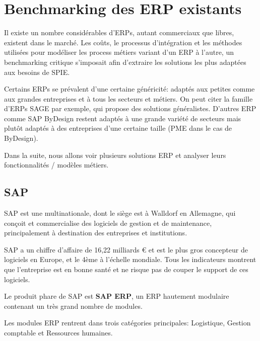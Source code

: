 \section{Benchmarking des ERP existants}
    Il existe un nombre considérables d'ERPs, autant commerciaux que libres, existent dans le marché. Les coûts, le processus d'intégration et les méthodes utilisées pour modéliser les process métiers variant d'un ERP à l'autre, un benchmarking critique s'imposait afin d'extraire les solutions les plus adaptées aux besoins de SPIE.

    Certains ERPs se prévalent d'une certaine généricité: adaptés aux petites comme aux grandes entreprises et à tous les secteurs et métiers. On peut citer la famille d'ERPs SAGE par exemple, qui propose des solutions généralistes. D'autres ERP comme SAP ByDesign restent adaptés à une grande variété de secteurs mais plutôt adaptés à des entreprises d'une certaine taille (PME dans le cas de ByDesign).

    Dans la suite, nous allons voir plusieurs solutions ERP et analyser leurs fonctionnalités / modèles métiers.

    \subsection{SAP}

    SAP est une multinationale, dont le siège est à Walldorf en Allemagne, qui conçoit et commercialise des logiciels de gestion et de maintenance, principalement à destination des entreprises et institutions.

    SAP a un chiffre d'affaire de 16,22 milliards € et est le plus gros concepteur de logiciels en Europe, et le 4ème à l'échelle mondiale. Tous les indicateurs montrent que l'entreprise est en bonne santé et ne risque pas de couper le support de ces logiciels.

    Le produit phare de SAP est \textbf{SAP ERP}, un ERP hautement modulaire contenant un très grand nombre de modules.

    Les modules ERP rentrent dans trois catégories principales: Logistique, Gestion comptable et Ressources humaines.


